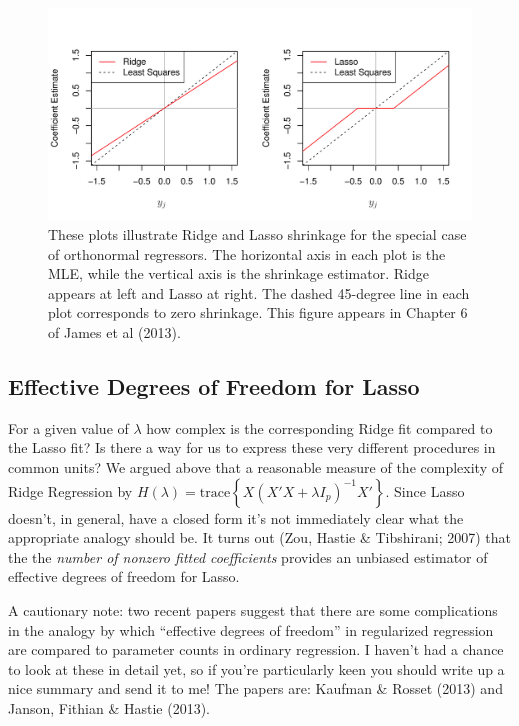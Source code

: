 \begin{figure}
	\centering
	\includegraphics[scale=0.7]{./img/ISLR_ch6_fig10}
	\caption{These plots illustrate Ridge and Lasso shrinkage for the special case of orthonormal regressors. The horizontal axis in each plot is the MLE, while the vertical axis is the shrinkage estimator. Ridge appears at left and Lasso at right. The dashed 45-degree line in each plot corresponds to zero shrinkage. This figure appears in Chapter 6 of James et al (2013).}
	\label{fig:ridge_lasso_shrink}
\end{figure}

\subsection{Effective Degrees of Freedom for Lasso}
For a given value of $\lambda$ how complex is the corresponding Ridge fit compared to the Lasso fit? Is there a way for us to express these very different procedures in common units? We argued above that a reasonable measure of the complexity of Ridge Regression by $H(\lambda) = \mbox{trace}\left\{ X(X'X + \lambda I_p)^{-1} X'\right\}$. Since Lasso doesn't, in general, have a closed form it's not immediately clear what the appropriate analogy should be. It turns out (Zou, Hastie \& Tibshirani; 2007) that the the \emph{number of nonzero fitted coefficients} provides an unbiased estimator of effective degrees of freedom for Lasso. 

A cautionary note: two recent papers suggest that there are some complications in the analogy by which ``effective degrees of freedom'' in regularized regression are compared to parameter counts in ordinary regression. I haven't had a chance to look at these in detail yet, so if you're particularly keen you should write up a nice summary and send it to me! The papers are: Kaufman \& Rosset (2013) and Janson, Fithian \& Hastie (2013).

